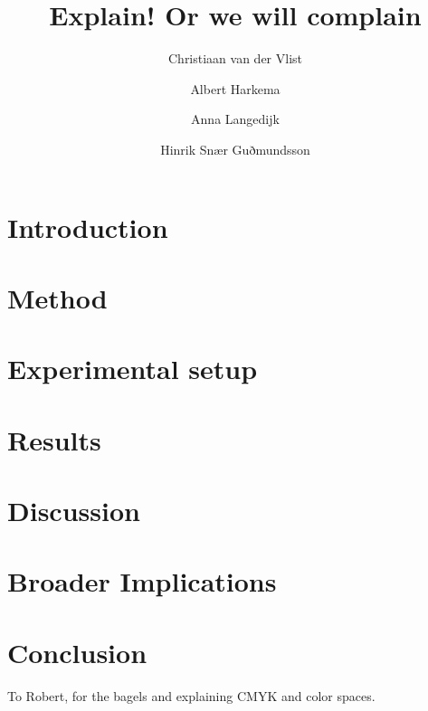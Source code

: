 \documentclass[sigconf,authordraft]{acmart}
\begin{document}
\title{Explain! Or we will complain}
\author{Christiaan van der Vlist}

\author{Albert Harkema}

\author{Anna Langedijk}

\author{Hinrik Snær Guðmundsson}
\renewcommand{\shortauthors}{van der Vlist, et al.}

\begin{abstract}

\end{abstract}

\maketitle

\section{Introduction}


\section{Method}


\section{Experimental setup}


\section{Results}


\section{Discussion}


\section{Broader Implications}


\section{Conclusion}


\begin{acks}
To Robert, for the bagels and explaining CMYK and color spaces.
\end{acks}



\end{document}
